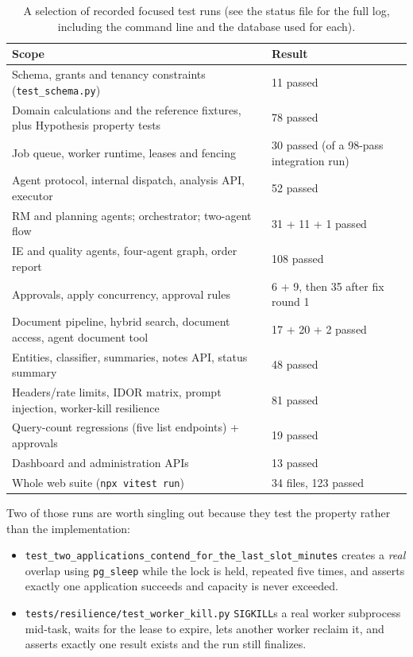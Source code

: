 \documentclass[11pt,a4paper]{article}
\begin{document}
\begin{table}[h]
\centering\small
\caption{A selection of recorded focused test runs (see the status file for the
full log, including the command line and the database used for each).}
\begin{tabularx}{\linewidth}{@{}YL{2.2cm}@{}}
\toprule
\textbf{Scope} & \textbf{Result}\\
\midrule
Schema, grants and tenancy constraints (\texttt{test\_schema.py}) & 11 passed\\
Domain calculations and the reference fixtures, plus Hypothesis property tests & 78 passed\\
Job queue, worker runtime, leases and fencing & 30 passed (of a 98-pass integration run)\\
Agent protocol, internal dispatch, analysis API, executor & 52 passed\\
RM and planning agents; orchestrator; two-agent flow & 31 + 11 + 1 passed\\
IE and quality agents, four-agent graph, order report & 108 passed\\
Approvals, apply concurrency, approval rules & 6 + 9, then 35 after fix round 1\\
Document pipeline, hybrid search, document access, agent document tool & 17 + 20 + 2 passed\\
Entities, classifier, summaries, notes API, status summary & 48 passed\\
Headers/rate limits, IDOR matrix, prompt injection, worker-kill resilience & 81 passed\\
Query-count regressions (five list endpoints) + approvals & 19 passed\\
Dashboard and administration APIs & 13 passed\\
Whole web suite (\texttt{npx vitest run}) & 34 files, 123 passed\\
\bottomrule
\end{tabularx}
\end{table}

Two of those runs are worth singling out because they test the property rather
than the implementation:

\begin{itemize}
\item \texttt{test\_two\_applications\_contend\_for\_the\_last\_slot\_minutes}
  creates a \emph{real} overlap using \texttt{pg\_sleep} while the lock is held,
  repeated five times, and asserts exactly one application succeeds and capacity
  is never exceeded.
\item \texttt{tests/resilience/test\_worker\_kill.py} \texttt{SIGKILL}s a real
  worker subprocess mid-task, waits for the lease to expire, lets another worker
  reclaim it, and asserts exactly one result exists and the run still finalizes.
\end{itemize}
\end{document}
